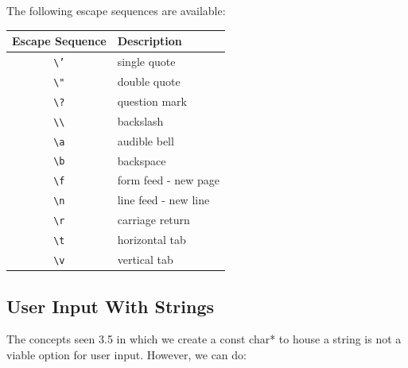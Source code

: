 \documentclass{report}
\begin{document}
    The following escape sequences are available:
    \begin{center}
    \begin{tabular}{|c|l|}
        \hline
        \textbf{Escape Sequence} & \textbf{Description} \\
        \hline
        \texttt{\textbackslash'} & single quote \\
        \texttt{\textbackslash"} & double quote \\
        \texttt{\textbackslash?} & question mark \\
        \texttt{\textbackslash\textbackslash} & backslash \\
        \texttt{\textbackslash a} & audible bell \\
        \texttt{\textbackslash b} & backspace \\
        \texttt{\textbackslash f} & form feed - new page \\
        \texttt{\textbackslash n} & line feed - new line \\
        \texttt{\textbackslash r} & carriage return \\
        \texttt{\textbackslash t} & horizontal tab \\
        \texttt{\textbackslash v} & vertical tab \\
        \hline
        \end{tabular}
    \end{center}


    \pagebreak \bigbreak \noindent 
    \subsection{User Input With Strings}
    \bigbreak \noindent 
    \begin{remark}
        The concepts seen 3.5 in which we create a const char* to house a string is not a viable option for user input. However, we can do:
    \end{remark}
\end{document}
